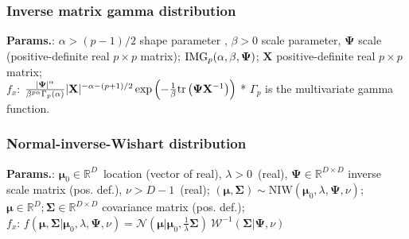     
        
\subsubsection{Inverse matrix gamma distribution}





    {\color{darkblue} \textbf{Params.}:} {$\alpha > (p - 1)/2 $ shape parameter ,  $\beta > 0 $ scale parameter,  $\boldsymbol\Psi$ scale (positive-definite real $p\times p$ matrix)}; {${\rm IMG}_{p}(\alpha,\beta,\boldsymbol\Psi)$}; {$\mathbf{X}$ positive-definite real $p\times p$ matrix};\hspace{0.5cm}\\{\color{darkblue} \textbf{$f_x$}:} {$\frac{|\boldsymbol\Psi|^{\alpha}}{\beta^{p\alpha}\Gamma_p(\alpha)} |\mathbf{X}|^{-\alpha-(p+1)/2}\exp\left(-\frac{1}{\beta}{\rm tr}\left(\boldsymbol\Psi\mathbf{X}^{-1}\right)\right)$ * $\Gamma_p$ is the multivariate gamma function.}



    
        
\subsubsection{Normal-inverse-Wishart distribution}





    {\color{darkblue} \textbf{Params.}:} {$\boldsymbol\mu_0\in\mathbb{R}^D\,$ location (vector of real),  $\lambda > 0\,$ (real),  $\boldsymbol\Psi \in\mathbb{R}^{D\times D}$ inverse scale matrix (pos. def.),  $\nu > D-1\,$ (real)}; {$(\boldsymbol\mu,\boldsymbol\Sigma) \sim \mathrm{NIW}(\boldsymbol\mu_0,\lambda,\boldsymbol\Psi,\nu)$}; {$\boldsymbol\mu\in\mathbb{R}^D ; \boldsymbol\Sigma \in\mathbb{R}^{D\times D}$ covariance matrix (pos. def.)};\hspace{0.5cm}\\{\color{darkblue} \textbf{$f_x$}:} {$f(\boldsymbol\mu,\boldsymbol\Sigma|\boldsymbol\mu_0,\lambda,\boldsymbol\Psi,\nu) = \mathcal{N}(\boldsymbol\mu|\boldsymbol\mu_0,\tfrac{1}{\lambda}\boldsymbol\Sigma)\ \mathcal{W}^{-1}(\boldsymbol\Sigma|\boldsymbol\Psi,\nu)$}



